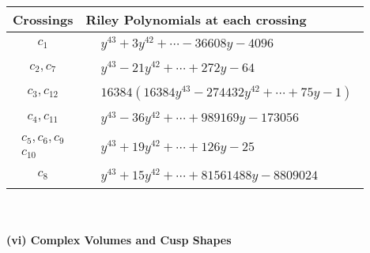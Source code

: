 \documentclass[1p]{elsarticle_modified}
\theoremstyle{definition}
\begin{document}
\begin{tabular}{m{50pt}|m{274pt}}
Crossings & \hspace{64pt}Riley Polynomials at each crossing \\
\hline $$\begin{aligned}c_{1}\end{aligned}$$&$\begin{aligned}
&y^{43}+3 y^{42}+\cdots-36608 y-4096
\end{aligned}$\\
\hline $$\begin{aligned}c_{2},c_{7}\end{aligned}$$&$\begin{aligned}
&y^{43}-21 y^{42}+\cdots+272 y-64
\end{aligned}$\\
\hline $$\begin{aligned}c_{3},c_{12}\end{aligned}$$&$\begin{aligned}
&16384(16384 y^{43}-274432 y^{42}+\cdots+75 y-1)
\end{aligned}$\\
\hline $$\begin{aligned}c_{4},c_{11}\end{aligned}$$&$\begin{aligned}
&y^{43}-36 y^{42}+\cdots+989169 y-173056
\end{aligned}$\\
\hline $$\begin{aligned}c_{5},c_{6},c_{9}\\c_{10}\end{aligned}$$&$\begin{aligned}
&y^{43}+19 y^{42}+\cdots+126 y-25
\end{aligned}$\\
\hline $$\begin{aligned}c_{8}\end{aligned}$$&$\begin{aligned}
&y^{43}+15 y^{42}+\cdots+81561488 y-8809024
\end{aligned}$\\
\hline
\end{tabular}\\~\\
\newpage\flushleft \textbf{(vi) Complex Volumes and Cusp Shapes}
\end{document}
